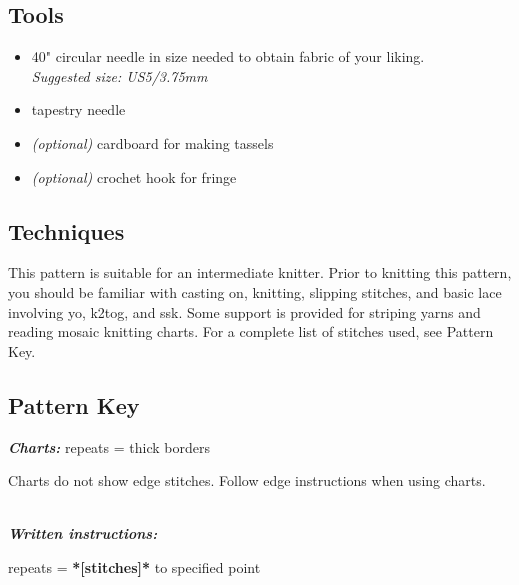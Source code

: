 \documentclass[12pt]{article}
\newcommand{\vocab}[1]{\emph{\textbf{#1}}} %
\begin{document}
\begin{multicols}{2}
\subsection*{Tools}

\begin{itemize}
\item 40" circular needle in size needed to obtain fabric of your liking. \\ \emph{Suggested size: US5/3.75mm} \vspace{-.5em}
\item tapestry needle \vspace{-.5em}
\item \emph{(optional)} cardboard for making tassels \vspace{-.5em}
\item \emph{(optional)} crochet hook for fringe \vspace{-.5em}
\end{itemize}

\subsection*{Techniques}

This pattern is suitable for an intermediate knitter. %
Prior to knitting this pattern, you should be familiar with casting on, knitting, slipping stitches, and basic lace involving yo, k2tog, and ssk. Some support is provided for striping yarns and reading mosaic knitting charts. %
For a complete list of stitches used, see Pattern Key.


\normalsize

\subsection*{Pattern Key}

\vocab{Charts:} repeats = thick borders \chart{\!\underline{\overline{-}}\!}  

Charts do not show edge stitches. Follow edge instructions when using charts.

~\\
\vocab{Written instructions:} 

repeats = \textbf{*[stitches]*} to specified point
\vspace{-1em}


\end{multicols}
\end{document}
